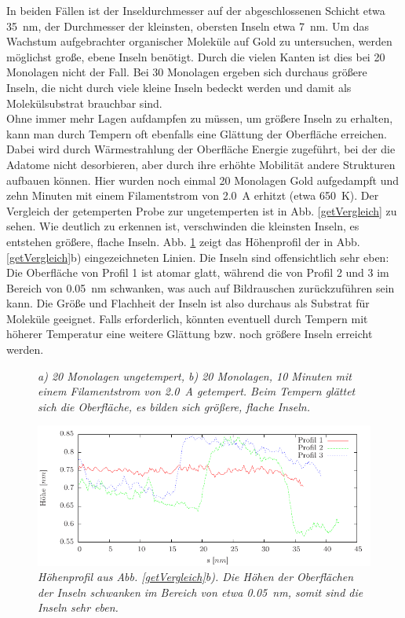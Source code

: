 In beiden Fällen ist der Inseldurchmesser auf der abgeschlossenen Schicht etwa \SI{35}{nm}, der Durchmesser
der kleinsten, obersten Inseln etwa \SI{7}{nm}. Um das Wachstum aufgebrachter organischer Moleküle
auf Gold zu untersuchen, werden möglichst große, ebene Inseln benötigt. Durch die vielen Kanten ist dies bei
20 Monolagen nicht der Fall. Bei 30 Monolagen ergeben sich durchaus größere Inseln, die nicht durch
viele kleine Inseln bedeckt werden und damit als Molekülsubstrat brauchbar sind.\\
Ohne immer mehr Lagen aufdampfen zu müssen, um größere Inseln zu erhalten, kann man durch Tempern
oft ebenfalls eine Glättung der Oberfläche erreichen. Dabei wird durch Wärmestrahlung der Oberfläche
Energie zugeführt, bei der die Adatome nicht desorbieren, aber durch ihre erhöhte Mobilität
andere Strukturen aufbauen können. Hier wurden noch einmal 20 Monolagen Gold aufgedampft und zehn
Minuten mit einem Filamentstrom von \SI{2,0}{A} erhitzt (etwa \SI{650}{K}). Der Vergleich der
getemperten Probe zur ungetemperten ist in Abb. \ref{getVergleich} zu sehen.
Wie deutlich zu erkennen ist, verschwinden die kleinsten Inseln, es entstehen größere, flache
Inseln. Abb. \ref{profil20MLget} zeigt das Höhenprofil der in Abb. \ref{getVergleich}b)
eingezeichneten Linien. Die Inseln sind offensichtlich sehr eben: Die Oberfläche von Profil 1 ist
atomar glatt, während die von Profil 2 und 3 im Bereich von \SI{0,05}{nm} schwanken, was auch auf
Bildrauschen zurückzuführen sein kann. Die Größe und Flachheit der Inseln ist also durchaus als
Substrat für Moleküle geeignet. Falls erforderlich, könnten eventuell durch Tempern mit höherer
Temperatur eine weitere Glättung bzw. noch größere Inseln erreicht werden. 

\begin{figure}[htbp]
	\begin{minipage}[b]{0.5\textwidth} 
		\sffamily
		
	\end{minipage}
	\hfill
	\begin{minipage}[b]{0.5\textwidth}
		\sffamily
		
	\end{minipage}
	\caption{\textit{a) 20 Monolagen ungetempert, b) 20 Monolagen, 10 Minuten mit einem Filamentstrom
	von \SI{2,0}{A} getempert.
	Beim Tempern glättet sich die Oberfläche, es bilden sich größere, flache Inseln.}}
	\label{getVergleich} 
	\vfill
	\centering
		\includegraphics{pics/profiles20MLget}
	\caption{\textit{Höhenprofil aus Abb. \ref{getVergleich}b). Die Höhen der Oberflächen der Inseln
	schwanken im Bereich von etwa \SI{0,05}{nm}, somit sind die Inseln sehr eben.}}
	\label{profil20MLget}
\end{figure}